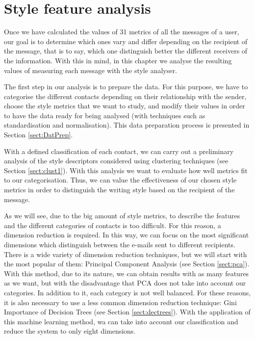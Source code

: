 \chapter{Style feature analysis}\label{cap:analysis}


Once we have calculated the values of 31 metrics of all the messages of a user, our goal is to determine which ones vary and differ depending on the recipient of the message, that is to say, which one distinguish better the different receivers of the information. With this in mind, in this chapter we analyse the resulting values of measuring each message with the style analyser.

The first step in our analysis is to prepare the data. For this purpose, we have to categorise the different contacts depending on their relationship with the sender, choose the style metrics that we want to study, and modify their values in order to have the data ready for being analysed (with techniques such as standardisation and normalisation). This data preparation process is presented in Section \ref{sect:DatPrep}.

With a defined classification of each contact, we can carry out a preliminary analysis of the style descriptors considered using clustering techniques (see Section \ref{sect:clust1}). With this analysis we want to evaluate how well metrics fit to our categorisation. Thus, we can value the effectiveness of our chosen style metrics in order to distinguish the writing style based on the recipient of the message.

As we will see, due to the big amount of style metrics, to describe the features and the different categories of contacts is too difficult. For this reason, a dimension reduction is required. In this way, we can focus on the most significant dimensions which distinguish between the e-mails sent to different recipients. There is a wide variety of dimension reduction techniques, but we will start with the most popular of them: Principal Component Analysis (see Section \ref{sect:pca}). With this method, due to its nature, we can obtain results with as many features as we want, but with the disadvantage that PCA does not take into account our categories. In addition to it, each category is not well balanced. For these reasons, it is also necessary to use a less common dimension reduction technique: Gini Importance of Decision Trees (see Section \ref{sect:dectrees}). With the application of this machine learning method, wa can take into account our classification and reduce the system to only eight dimensions.

